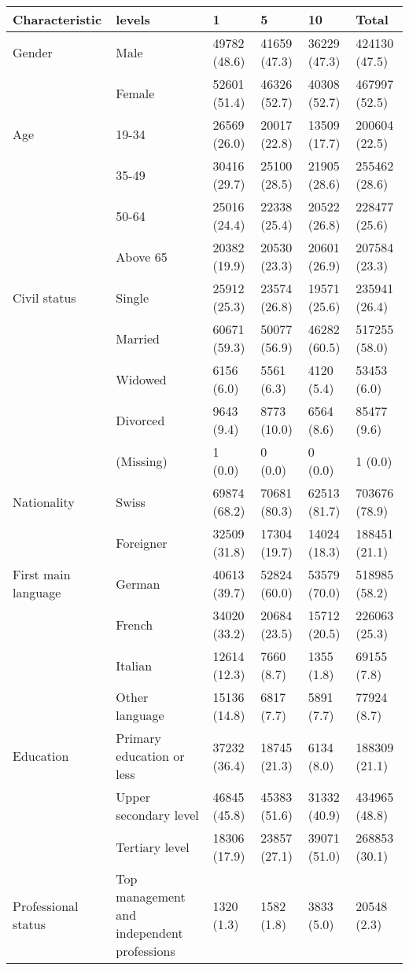 
\begin{tabular}{llllll}
\toprule
Characteristic & levels & 1 & 5 & 10 & Total\\
\midrule
Gender & Male & 49782 (48.6) & 41659 (47.3) & 36229 (47.3) & 424130 (47.5)\\
 & Female & 52601 (51.4) & 46326 (52.7) & 40308 (52.7) & 467997 (52.5)\\
\addlinespace
Age & 19-34 & 26569 (26.0) & 20017 (22.8) & 13509 (17.7) & 200604 (22.5)\\
 & 35-49 & 30416 (29.7) & 25100 (28.5) & 21905 (28.6) & 255462 (28.6)\\
 & 50-64 & 25016 (24.4) & 22338 (25.4) & 20522 (26.8) & 228477 (25.6)\\
 & Above 65 & 20382 (19.9) & 20530 (23.3) & 20601 (26.9) & 207584 (23.3)\\
\addlinespace
Civil status & Single & 25912 (25.3) & 23574 (26.8) & 19571 (25.6) & 235941 (26.4)\\
 & Married & 60671 (59.3) & 50077 (56.9) & 46282 (60.5) & 517255 (58.0)\\
 & Widowed & 6156 (6.0) & 5561 (6.3) & 4120 (5.4) & 53453 (6.0)\\
 & Divorced & 9643 (9.4) & 8773 (10.0) & 6564 (8.6) & 85477 (9.6)\\
 & (Missing) & 1 (0.0) & 0 (0.0) & 0 (0.0) & 1 (0.0)\\
\addlinespace
Nationality & Swiss & 69874 (68.2) & 70681 (80.3) & 62513 (81.7) & 703676 (78.9)\\
 & Foreigner & 32509 (31.8) & 17304 (19.7) & 14024 (18.3) & 188451 (21.1)\\
\addlinespace
First main language & German & 40613 (39.7) & 52824 (60.0) & 53579 (70.0) & 518985 (58.2)\\
 & French & 34020 (33.2) & 20684 (23.5) & 15712 (20.5) & 226063 (25.3)\\
 & Italian & 12614 (12.3) & 7660 (8.7) & 1355 (1.8) & 69155 (7.8)\\
 & Other language & 15136 (14.8) & 6817 (7.7) & 5891 (7.7) & 77924 (8.7)\\
\addlinespace
Education & Primary education or less & 37232 (36.4) & 18745 (21.3) & 6134 (8.0) & 188309 (21.1)\\
 & Upper secondary level & 46845 (45.8) & 45383 (51.6) & 31332 (40.9) & 434965 (48.8)\\
 & Tertiary level & 18306 (17.9) & 23857 (27.1) & 39071 (51.0) & 268853 (30.1)\\
\addlinespace
Professional status & Top management and independent professions & 1320 (1.3) & 1582 (1.8) & 3833 (5.0) & 20548 (2.3)\\

\end{tabular}
